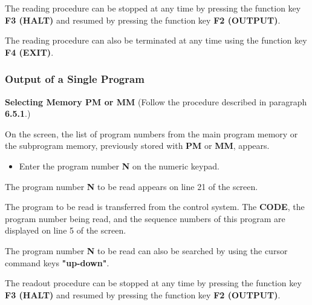 \notes

The reading procedure can be stopped at any time by pressing the function key \textbf{F3 (HALT)} and resumed by pressing the function key \textbf{F2 (OUTPUT)}.

The reading procedure can also be terminated at any time using the function key \textbf{F4 (EXIT)}.

\newpage

\subsubsection{Output of a Single Program}

\textbf{Selecting Memory PM or MM}  
(Follow the procedure described in paragraph \textbf{6.5.1}.)

On the screen, the list of program numbers from the main program memory or the subprogram memory, previously stored with \textbf{PM} or \textbf{MM}, appears.

\begin{itemize}
    \item Enter the program number \textbf{N} on the numeric keypad.
\end{itemize}

\vspace{.5cm}

The program number \textbf{N} to be read appears on line 21 of the screen.

\begin{itemize}
\end{itemize}

\vspace{.5cm}

\begin{itemize}
\end{itemize}

The program to be read is transferred from the control system.  
The \textbf{CODE}, the program number being read, and the sequence numbers of this program are displayed on line 5 of the screen.

\notes

The program number \textbf{N} to be read can also be searched by using the cursor command keys \textbf{"up-down"}.

The readout procedure can be stopped at any time by pressing the function key \textbf{F3 (HALT)} and resumed by pressing the function key \textbf{F2 (OUTPUT)}.

